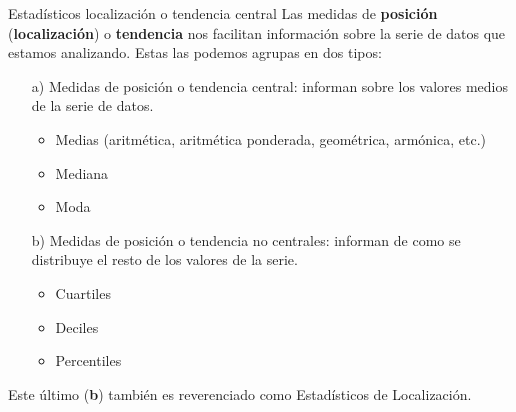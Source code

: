 \documentclass[11pt]{beamer}
\begin{document}
        \begin{frame}{Estadísticos localización o tendencia central}
          Las medidas de \textbf{posición} (\textbf{localización}) o \textbf{tendencia} nos facilitan información sobre la serie de datos que estamos analizando. Estas las podemos agrupas en dos tipos:
          \\
          \begin{itemize}[<+->]
              \item [a)]Medidas de posición o tendencia central: informan sobre los valores medios de la serie de datos.
              \begin{itemize}
                  \item Medias (aritmética, aritmética ponderada, geométrica, armónica, etc.)
                  \item Mediana
                  \item Moda
              \end{itemize}


              \item[b)] Medidas de posición o tendencia no centrales: informan de como se distribuye el resto de los valores de la serie.
              \begin{itemize}
                  \item Cuartiles
                  \item Deciles
                  \item Percentiles
              \end{itemize}
          \end{itemize}
          \pause
          Este \'ultimo (\textbf{b}) también es reverenciado como Estadísticos de Localización.
        \end{frame}
\end{document}
